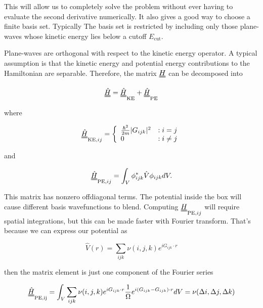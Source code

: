 \documentclass[12pt, a4paper, twocolumn]{article}
\begin{document}
This will allow us to completely solve the problem without ever having to evaluate the second derivative numerically. It also gives a good way to choose a finite basis set. Typically The basis set is restricted by including only those plane-waves whose kinetic energy lies below a cutoff $E_{\mathrm{cut}}$.

Plane-waves are orthogonal with respect to the kinetic energy operator. A typical assumption is that the kinetic energy and potential energy contributions to the Hamiltonian are separable. Therefore, the matrix $\uuline{H}$ can be decomposed into 

\begin{equation}
\uuline{\hat{H}} = \uuline{\hat{H}}_{\mathrm{KE}} + \uuline{\hat{H}}_{\mathrm{PE}}
\end{equation}

where 

\begin{equation}
\uuline{\hat{H}}_{\mathrm{KE},ij} = \left\{
     \begin{array}{lr}
       \frac{\hbar^2}{2m} |G_{ijk}|^2 & : i = j\\
       0 & : i \neq j
     \end{array}
   \right.  
\end{equation}

and

\begin{equation}
\uuline{\hat{H}}_{\mathrm{PE},ij} = \int_V \phi_{ijk}^* \hat{V} \phi_{ijk} dV.
\end{equation}

This matrix has nonzero offdiagonal terms. The potential inside the box will cause different basis wavefunctions to blend. Computing $\uuline{H}_{\mathrm{PE},ij}$ will require spatial integrations, but this can be made faster with Fourier transform. That's because we can express our potential as 

\begin{equation}
	\hat{V}(r) = \sum_{ijk} \nu (i,j,k) e ^ {i G_{ijk} \cdot r}
\end{equation} 

then the matrix element is just one component of the Fourier series

\begin{equation}
\uuline{\hat{H}}_{\mathrm{PE,ij}} = \int_V \sum_{ijk} \nu (i,j,k) e ^ {i G_{ijk} \cdot r} \frac{1}{\Omega} e^{i (G_{ijk} - G_{ijk})\cdot r} dV = \nu(\Delta i,\Delta j, \Delta k)
\end{equation}
\end{document}
